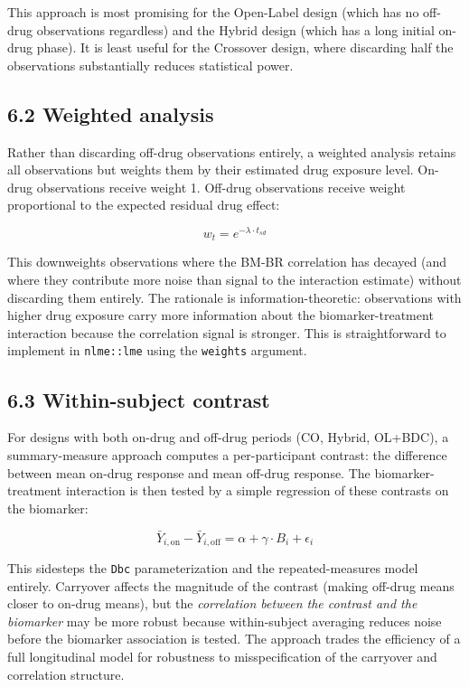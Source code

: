 \documentclass[
]{article}
\begin{document}
This approach is most promising for the Open-Label design (which
has no off-drug observations regardless) and the Hybrid design
(which has a long initial on-drug phase). It is least useful for
the Crossover design, where discarding half the observations
substantially reduces statistical power.

\subsection{6.2 Weighted analysis}

Rather than discarding off-drug observations entirely, a weighted
analysis retains all observations but weights them by their
estimated drug exposure level. On-drug observations receive
weight 1. Off-drug observations receive weight proportional to
the expected residual drug effect:

\[w_t = e^{-\lambda \cdot t_{sd}}\]

This downweights observations where the BM-BR correlation has
decayed (and where they contribute more noise than signal to the
interaction estimate) without discarding them entirely. The
rationale is information-theoretic: observations with higher drug
exposure carry more information about the biomarker-treatment
interaction because the correlation signal is stronger. This is
straightforward to implement in \texttt{nlme::lme} using the \texttt{weights}
argument.

\subsection{6.3 Within-subject contrast}

For designs with both on-drug and off-drug periods (CO, Hybrid,
OL+BDC), a summary-measure approach computes a per-participant
contrast: the difference between mean on-drug response and mean
off-drug response. The biomarker-treatment interaction is then
tested by a simple regression of these contrasts on the biomarker:

\[\bar{Y}_{i,\text{on}} - \bar{Y}_{i,\text{off}} = \alpha +
\gamma \cdot B_i + \epsilon_i\]

This sidesteps the \texttt{Dbc} parameterization and the
repeated-measures model entirely. Carryover affects the
magnitude
of the contrast (making off-drug means closer to on-drug means),
but the \textit{correlation between the contrast and the biomarker} may
be more robust because within-subject averaging reduces noise
before the biomarker association is tested. The approach trades
the efficiency of a full longitudinal model for robustness to
misspecification of the carryover and correlation structure.
\end{document}

